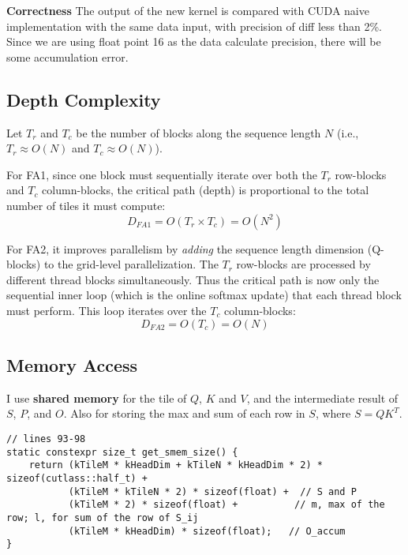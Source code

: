 \documentclass[11pt]{article}
\begin{document}
\textbf{Correctness} The output of the new kernel is compared with CUDA naive implementation with the same data input, with precision of diff less than 2\%. Since we are using float point 16 as the data calculate precision, there will be some accumulation error.


\subsection{Depth Complexity}

Let $T_r$ and $T_c$ be the number of blocks along the sequence length $N$ (i.e., $T_r \approx O(N)$ and $T_c \approx O(N)$).


For FA1, since one block must sequentially iterate over both the $T_r$ row-blocks and $T_c$ column-blocks, the critical path (depth) is proportional to the total number of tiles it must compute:
              \[ D_{FA1} = O(T_r \times T_c) = O(N^2) \]

For FA2, it improves parallelism by \textit{adding} the sequence length dimension (Q-blocks) to the grid-level parallelization. The $T_r$ row-blocks are processed by different thread blocks simultaneously. Thus the critical path is now only the sequential inner loop (which is the online softmax update) that each thread block must perform. This loop iterates over the $T_c$ column-blocks:
              \[ D_{FA2} = O(T_c) = O(N) \]



\subsection{Memory Access}

I use \textbf{shared memory} for the tile of $Q$, $K$ and $V$, and the intermediate result of $S$, $P$, and $O$. Also for storing the max and sum of each row in $S$, where $S=QK^T$.
\begin{lstlisting}
// lines 93-98
static constexpr size_t get_smem_size() {
    return (kTileM * kHeadDim + kTileN * kHeadDim * 2) * sizeof(cutlass::half_t) +
           (kTileM * kTileN * 2) * sizeof(float) +  // S and P
           (kTileM * 2) * sizeof(float) +          // m, max of the row; l, for sum of the row of S_ij
           (kTileM * kHeadDim) * sizeof(float);   // O_accum
}
\end{lstlisting}
\end{document}

